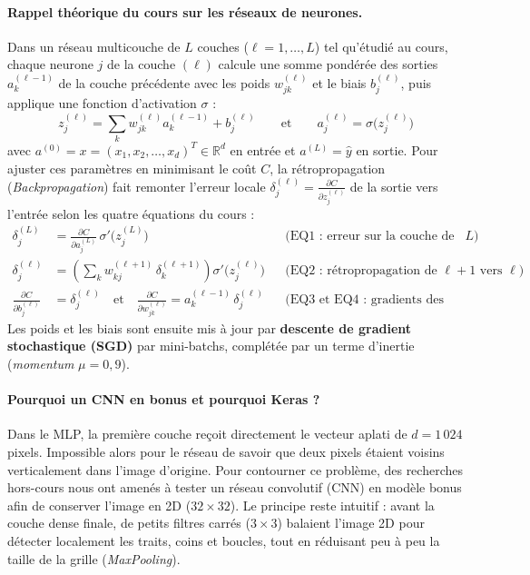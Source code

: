 \documentclass[10pt,a4paper]{article}
\begin{document}
\paragraph{Rappel théorique du cours sur les réseaux de neurones.}
Dans un réseau multicouche de $L$ couches ($\ell = 1, \dots, L$) tel qu'étudié au cours, chaque neurone $j$ de la couche $(\ell)$ calcule une somme pondérée des sorties $a^{(\ell-1)}_k$ de la couche précédente avec les poids $w^{(\ell)}_{jk}$ et le biais $b^{(\ell)}_j$, puis applique une fonction d'activation $\sigma$ :
\[
z^{(\ell)}_j = \sum_k w^{(\ell)}_{jk} a^{(\ell-1)}_k + b^{(\ell)}_j \qquad \text{et} \qquad a^{(\ell)}_j = \sigma\big(z^{(\ell)}_j\big)
\]
avec $a^{(0)} = x = (x_1, x_2, \dots, x_d)^T \in \mathbb{R}^d$ en entrée et $a^{(L)} = \hat{y}$ en sortie. Pour ajuster ces paramètres en minimisant le coût $C$, la rétropropagation (\emph{Backpropagation}) fait remonter l'erreur locale $\delta^{(\ell)}_j = \frac{\partial C}{\partial z^{(\ell)}_j}$ de la sortie vers l'entrée selon les quatre équations du cours :
\begin{align}
\delta^{(L)}_j &= \frac{\partial C}{\partial a^{(L)}_j}\,\sigma'\big(z^{(L)}_j\big) && \text{(EQ1 : erreur sur la couche de sortie $L$)} \\
\delta^{(\ell)}_j &= \left(\sum_k w^{(\ell+1)}_{kj}\,\delta^{(\ell+1)}_k\right)\sigma'\big(z^{(\ell)}_j\big) && \text{(EQ2 : rétropropagation de $\ell+1$ vers $\ell$)} \\
\frac{\partial C}{\partial b^{(\ell)}_j} &= \delta^{(\ell)}_j \quad \text{et} \quad \frac{\partial C}{\partial w^{(\ell)}_{jk}} = a^{(\ell-1)}_k\,\delta^{(\ell)}_j && \text{(EQ3 et EQ4 : gradients des biais et des poids)}
\end{align}
Les poids et les biais sont ensuite mis à jour par \textbf{descente de gradient stochastique (SGD)} par mini-batchs, complétée par un terme d'inertie (\emph{momentum} $\mu = 0{,}9$).

\paragraph{Pourquoi un CNN en bonus et pourquoi Keras ?}
Dans le MLP, la première couche reçoit directement le vecteur aplati de $d=1\,024$ pixels. Impossible alors pour le réseau de savoir que deux pixels étaient voisins verticalement dans l'image d'origine. Pour contourner ce problème, des recherches hors-cours nous ont amenés à tester un réseau convolutif (CNN) en modèle bonus afin de conserver l'image en 2D ($32\times32$). Le principe reste intuitif : avant la couche dense finale, de petits filtres carrés ($3\times3$) balaient l'image 2D pour détecter localement les traits, coins et boucles, tout en réduisant peu à peu la taille de la grille (\emph{MaxPooling}).
\end{document}
